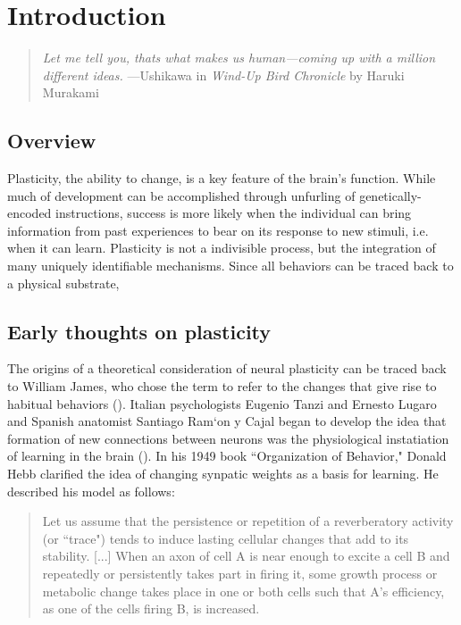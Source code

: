 \chapter{Introduction}

\begin{quotation}
\textit{Let me tell you, thats what makes us human---coming up with a million \mbox{different} ideas.}
\newline{}
\newline{}
 ---Ushikawa in \textit{Wind-Up Bird Chronicle} by Haruki Murakami
\end{quotation}

\section{Overview}

Plasticity, the ability to change, is a key feature of the brain's function. While much of development can be accomplished through unfurling of genetically-encoded instructions, success is more likely when the individual can bring information from past experiences to bear on its response to new stimuli, i.e. when it can learn. Plasticity is not a indivisible process, but the integration of many uniquely identifiable mechanisms. Since all behaviors can be traced back to a physical substrate, 

\section{Early thoughts on plasticity}
The origins of a theoretical consideration of neural plasticity can be traced back to William James, who chose the term to refer to the changes that give rise to habitual behaviors (\cite{James1910, Berlucchi2009}). Italian psychologists Eugenio Tanzi and Ernesto Lugaro and Spanish anatomist Santiago Ram\a`on y Cajal began to develop the idea that formation of new connections between neurons was the physiological instatiation of learning in the brain (\cite{Berlucchi2009}). In his 1949 book ``Organization of Behavior," Donald Hebb clarified the idea of changing synpatic weights as a basis for learning. He described his model as follows:

\begin{quotation}
Let us assume that the persistence or repetition of a reverberatory activity (or ``trace") tends to induce lasting cellular changes that add to its stability. [...] When an axon of cell A is near enough to excite a cell B and repeatedly or persistently takes part in firing it, some growth process or metabolic change takes place in one or both cells such that A's efficiency, as one of the cells firing B, is increased.
\end{quotation}

